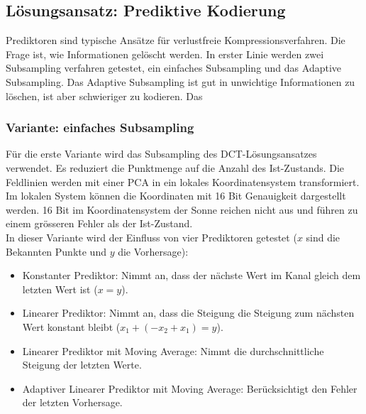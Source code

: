 \subsection{Lösungsansatz: Prediktive Kodierung}
Prediktoren sind typische Ansätze für verlustfreie Kompressionsverfahren. Die Frage ist, wie Informationen gelöscht werden. In erster Linie werden zwei Subsampling verfahren getestet, ein einfaches Subsampling und das Adaptive Subsampling. Das Adaptive Subsampling ist gut in unwichtige Informationen zu löschen, ist aber schwieriger zu kodieren. Das 

\subsubsection{Variante: einfaches Subsampling}
Für die erste Variante wird das Subsampling des DCT-Lösungsansatzes verwendet. Es reduziert die Punktmenge auf die Anzahl des Ist-Zustands. Die Feldlinien werden mit einer PCA in ein lokales Koordinatensystem transformiert. Im lokalen System können die Koordinaten mit 16 Bit Genauigkeit dargestellt werden. 16 Bit im Koordinatensystem der Sonne reichen nicht aus und führen zu einem grösseren Fehler als der Ist-Zustand.\\
In dieser Variante wird der Einfluss von vier Prediktoren getestet ($x$ sind die Bekannten Punkte und $y$ die Vorhersage):
\begin{itemize}
\item Konstanter Prediktor: Nimmt an, dass der nächste Wert im Kanal gleich dem  letzten Wert ist ($x = y$).
\item Linearer Prediktor: Nimmt an, dass die Steigung die Steigung zum nächsten Wert konstant bleibt ($x_1+(-x_2+x_1) = y$).
\item Linearer Prediktor mit Moving Average: Nimmt die durchschnittliche Steigung der letzten Werte.
\item Adaptiver Linearer Prediktor mit Moving Average: Berücksichtigt den Fehler der letzten Vorhersage.
\end{itemize}

